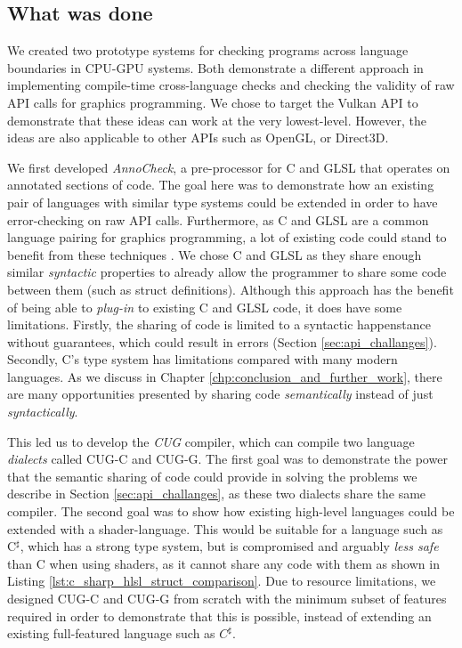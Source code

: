 \documentclass[a4paper,12pt,twoside,openright]{report}
\begin{document}
\subsection{What was done}

\label{sec:what_was_done}

We created two prototype systems for checking programs across language
boundaries in CPU-GPU systems. Both demonstrate a different approach in
implementing compile-time cross-language checks and checking the validity of
raw API calls for graphics programming. We chose to target the Vulkan API to
demonstrate that these ideas can work at the very lowest-level. However, the
ideas are also applicable to other APIs such as OpenGL, or Direct3D.

We first developed \textit{AnnoCheck}, a pre-processor for C and GLSL that
operates on annotated sections of code. The goal here was to demonstrate how an
existing pair of languages with similar type systems could be extended in order
to have error-checking on raw API calls. Furthermore, as C and GLSL are a
common language pairing for graphics programming, a lot of existing code could
stand to benefit from these techniques \cite{ListOfOpenGLGames}. We chose C and
GLSL as they share enough similar \textit{syntactic} properties to already
allow the programmer to share some code between them (such as struct
definitions). Although this approach has the benefit of being able to
\textit{plug-in} to existing C and GLSL code, it does have some limitations.
Firstly, the sharing of code is limited to a syntactic happenstance without
guarantees, which could result in errors (Section \ref{sec:api_challanges}).
Secondly, C's type system has limitations compared with many modern languages.
As we discuss in Chapter \ref{chp:conclusion_and_further_work}, there are many
opportunities presented by sharing code \textit{semantically} instead of just
\textit{syntactically}.


This led us to develop the \textit{CUG} compiler, which can compile two
language \textit{dialects} called CUG-C and CUG-G. The first goal was to
demonstrate the power that the semantic sharing of code could provide in
solving the problems we describe in Section \ref{sec:api_challanges}, as these
two dialects share the same compiler. The second goal was to show how existing
high-level languages could be extended with a shader-language. This would be
suitable for a language such as C$^\sharp$, which has a strong type system, but
is compromised and arguably \textit{less safe} than C when using shaders, as it
cannot share any code with them as shown in Listing
\ref{lst:c_sharp_hlsl_struct_comparison}. Due to resource limitations, we
designed CUG-C and CUG-G from scratch with the minimum subset of features
required in order to demonstrate that this is possible, instead of extending an
existing full-featured language such as $C^\sharp$.
\end{document}
